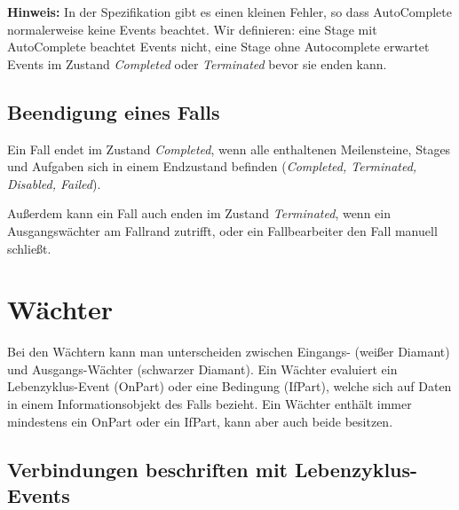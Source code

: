 \documentclass[12pt,report]{snetTeaching}
\begin{document}
\textbf{Hinweis:} In der Spezifikation gibt es einen kleinen Fehler, so dass AutoComplete normalerweise keine Events beachtet. Wir definieren: eine Stage mit AutoComplete beachtet Events nicht, eine Stage ohne Autocomplete erwartet Events im Zustand \emph{Completed} oder \emph{Terminated} bevor sie enden kann.



\subsection{Beendigung eines Falls}

Ein Fall endet im Zustand \emph{Completed}, wenn alle enthaltenen Meilensteine, Stages und Aufgaben  sich in einem Endzustand befinden (\emph{Completed, Terminated, Disabled, Failed}). 

Außerdem kann ein Fall auch enden im Zustand \emph{Terminated},  wenn ein Ausgangswächter am Fallrand zutrifft, oder ein Fallbearbeiter den Fall manuell schließt. 








\section{Wächter}

Bei den Wächtern kann man unterscheiden zwischen Eingangs- (weißer Diamant) und Ausgangs-Wächter (schwarzer Diamant). Ein Wächter evaluiert ein Lebenzyklus-Event (OnPart) oder eine Bedingung (IfPart), welche sich auf Daten in einem Informationsobjekt des Falls bezieht. Ein Wächter enthält immer mindestens ein OnPart oder ein IfPart, kann aber auch beide besitzen.

\subsection{Verbindungen beschriften mit Lebenzyklus-Events}
\label{konv:CMMN_VerbindungBeschriften}
\end{document}
